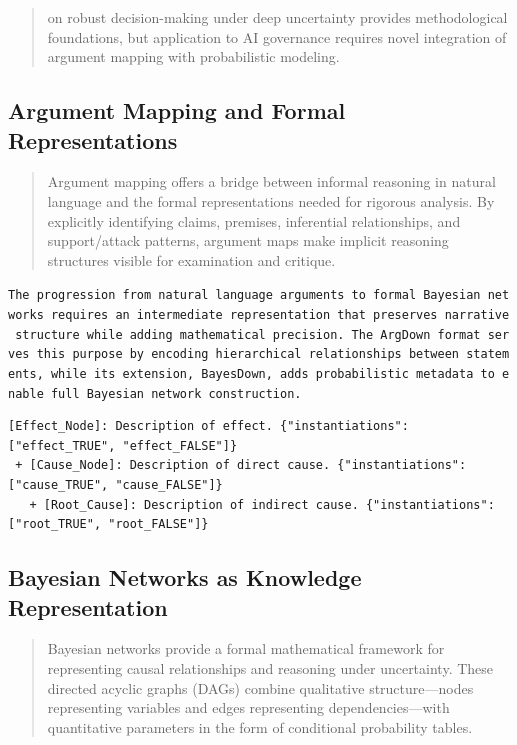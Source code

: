 \documentclass[
  11pt,
  letterpaper,
]{book}
\begin{document}
\begin{quote}
\textcite{lempert2003} on robust decision-making under deep uncertainty
provides methodological foundations, but application to AI governance
requires novel integration of argument mapping with probabilistic
modeling.
\end{quote}

\subsection{Argument Mapping and Formal
Representations}\label{sec-argument-mapping}

\begin{quote}
Argument mapping offers a bridge between informal reasoning in natural
language and the formal representations needed for rigorous analysis. By
explicitly identifying claims, premises, inferential relationships, and
support/attack patterns, argument maps make implicit reasoning
structures visible for examination and critique.
\end{quote}

\texttt{The\ progression\ from\ natural\ language\ arguments\ to\ formal\ Bayesian\ networks\ requires\ an\ intermediate\ representation\ that\ preserves\ narrative\ structure\ while\ adding\ mathematical\ precision.\ The\ ArgDown\ format\ serves\ this\ purpose\ by\ encoding\ hierarchical\ relationships\ between\ statements,\ while\ its\ extension,\ BayesDown,\ adds\ probabilistic\ metadata\ to\ enable\ full\ Bayesian\ network\ construction.}

\begin{verbatim}
[Effect_Node]: Description of effect. {"instantiations": ["effect_TRUE", "effect_FALSE"]}
 + [Cause_Node]: Description of direct cause. {"instantiations": ["cause_TRUE", "cause_FALSE"]}
   + [Root_Cause]: Description of indirect cause. {"instantiations": ["root_TRUE", "root_FALSE"]}
\end{verbatim}

\subsection{Bayesian Networks as Knowledge
Representation}\label{sec-bayesian-networks}

\begin{quote}
Bayesian networks provide a formal mathematical framework for
representing causal relationships and reasoning under uncertainty. These
directed acyclic graphs (DAGs) combine qualitative structure---nodes
representing variables and edges representing dependencies---with
quantitative parameters in the form of conditional probability tables.
\end{quote}
\end{document}
